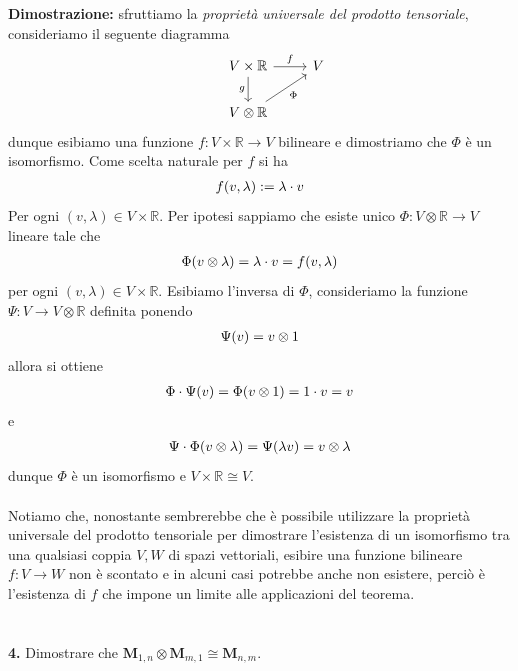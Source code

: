 \documentclass{article}
\begin{document}
\textbf{Dimostrazione:} sfruttiamo la \textit{proprietà universale del prodotto tensoriale}, consideriamo il seguente diagramma \\
\[
\begin{tikzcd}
&V \times \mathbb{R} \arrow[r,"f"] \arrow[d,"g", swap] & V \\
&V \otimes \mathbb{R} \arrow[ur, "\Phi", swap] 
\end{tikzcd}
\]
dunque esibiamo una funzione $f : V \times \mathbb{R} \longrightarrow V$ bilineare e dimostriamo che $\Phi$ è un isomorfismo. Come scelta naturale per $f$ si ha
\begin{gather}
    f(v, \lambda) := \lambda \cdot v \notag
\end{gather}
Per ogni $(v, \lambda) \in V \times \mathbb{R}$. Per ipotesi sappiamo che esiste unico $\Phi : V \otimes \mathbb{R} \longrightarrow V$ lineare tale che
\begin{gather}
    \Phi(v \otimes \lambda) = \lambda \cdot v = f(v, \lambda) \notag
\end{gather}
per ogni $(v, \lambda) \in V \times \mathbb{R}$. Esibiamo l'inversa di $\Phi$, consideriamo la funzione $\Psi : V \longrightarrow V \otimes \mathbb{R}$ definita ponendo
\begin{gather}
    \Psi (v) = v \otimes 1 \notag
\end{gather}
allora si ottiene
\begin{gather}
    \Phi \cdot \Psi (v) = \Phi(v \otimes 1) = 1 \cdot v = v \notag
\end{gather}
e
\begin{gather}
    \Psi \cdot \Phi (v \otimes \lambda) = \Psi (\lambda v) = v \otimes \lambda \notag
\end{gather}
dunque $\Phi$ è un isomorfismo e $V \times \mathbb{R} \cong V$. \\ \\
Notiamo che, nonostante sembrerebbe che è possibile utilizzare la proprietà universale del prodotto tensoriale per dimostrare l'esistenza di un isomorfismo tra una qualsiasi coppia $V, W$ di spazi vettoriali, esibire una funzione bilineare $f : V \longrightarrow W$ non è scontato e in alcuni casi potrebbe anche non esistere, perciò è l'esistenza di $f$ che impone un limite alle applicazioni del teorema. \\ \\ \\
\textbf{4.} Dimostrare che $\mathbf{M}_{1, n} \otimes \mathbf{M}_{m, 1} \cong \mathbf{M}_{n, m}$. \\
\end{document}
